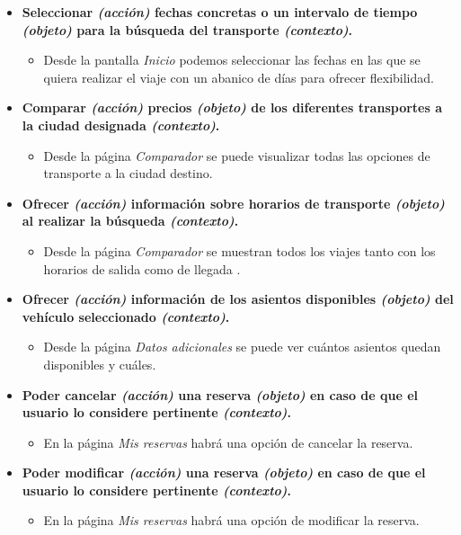 \begin{itemize}
    \item \textbf{Seleccionar \textit{(acción)} fechas concretas o un intervalo de tiempo \textit{(objeto)} para la búsqueda del transporte \textit{(contexto)}.}
        \begin{itemize}
            \item Desde la pantalla \textit{Inicio} podemos seleccionar las fechas en las que se quiera realizar el viaje con un abanico de días para
                ofrecer flexibilidad.
        \end{itemize}
    
    \item \textbf{Comparar \textit{(acción)} precios \textit{(objeto)} de los diferentes transportes a la ciudad designada \textit{(contexto)}.}
        \begin{itemize}
            \item Desde la página \textit{Comparador} se puede visualizar todas las opciones de transporte a la ciudad destino.
        \end{itemize}

    \item \textbf{Ofrecer \textit{(acción)} información sobre horarios de transporte \textit{(objeto)} al realizar la búsqueda \textit{(contexto)}.}
        \begin{itemize}
            \item Desde la página \textit{Comparador} se muestran todos los viajes tanto con los horarios de salida como de llegada .
        \end{itemize}

    \item \textbf{Ofrecer \textit{(acción)} información de los asientos disponibles \textit{(objeto)} del vehículo seleccionado \textit{(contexto)}.}
        \begin{itemize}
            \item Desde la página \textit{Datos adicionales} se puede ver cuántos asientos quedan disponibles y cuáles.
        \end{itemize}

    \item \textbf{Poder cancelar \textit{(acción)} una reserva \textit{(objeto)} en caso de que el usuario lo considere pertinente \textit{(contexto)}.}
        \begin{itemize}
            \item En la página \textit{Mis reservas} habrá una opción de cancelar la reserva.
        \end{itemize}

    \item \textbf{Poder modificar \textit{(acción)} una reserva \textit{(objeto)} en caso de que el usuario lo considere pertinente \textit{(contexto)}.}
        \begin{itemize}
            \item En la página \textit{Mis reservas} habrá una opción de modificar la reserva.
        \end{itemize}
\end{itemize}


